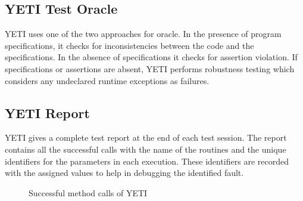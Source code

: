 \subsection{YETI Test Oracle}
YETI uses one of the two approaches for oracle. In the presence of program specifications, it checks for inconsistencies between the code and the specifications. In the absence of specifications it checks for assertion violation.%
If specifications or assertions are absent, YETI performs robustness testing which considers any undeclared runtime exceptions as failures. 


\subsection{YETI Report}
YETI gives a complete test report at the end of each test session. The report contains all the successful calls with the name of the routines and the unique identifiers for the parameters in each execution. These identifiers are recorded with the assigned values to help in debugging the identified fault. 
\\
\begin{figure}[h]
	\centering
	\caption{Successful method calls of YETI}
\end{figure}

